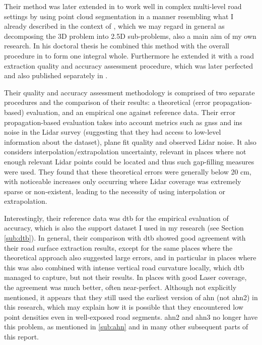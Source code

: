 Their method was later extended in \cite{oudeElberink_vosselman_2009} to work well in complex multi-level road settings by using point cloud segmentation in a manner resembling what I already described in the context of \cite{boyko_funkhauser_2011}, which we may regard in general as decomposing the 3D problem into 2.5D sub-problems, also a main aim of my own research. In his doctoral thesis \cite{oudeElberink_2010} he combined this method with the overall procedure in \cite{oudeElberink_vosselman_2006} to form one integral whole. Furthermore he extended it with a road extraction quality and accuracy assessment procedure, which was later perfected and also published separately in \cite{oudeElberink_vosselman_2012}.

Their quality and accuracy assessment methodology is comprised of two separate procedures and the comparison of their results: a theoretical (error propagation-based) evaluation, and an empirical one against reference data. Their error propagation-based evaluation takes into account metrics such as \ac{gnss} and \ac{ins} noise in the Lidar survey (suggesting that they had access to low-level information about the dataset), plane fit quality and observed Lidar noise. It also considers interpolation/extrapolation uncertainty, relevant in places where not enough relevant Lidar points could be located and thus such gap-filling measures were used. They found that these theoretical errors were generally below 20 cm, with noticeable increases only occurring where Lidar coverage was extremely sparse or non-existent, leading to the necessity of using interpolation or extrapolation. 

Interestingly, their reference data was \ac{dtb} for the empirical evaluation of accuracy, which is also the support dataset I used in my research (see Section \ref{sub:dtb}). In general, their comparison with \ac{dtb} showed good agreement with their road surface extraction results, except for the same places where the theoretical approach also suggested large errors, and in particular in places where this was also combined with intense vertical road curvature locally, which \ac{dtb} managed to capture, but not their results. In places with good Laser coverage, the agreement was much better, often near-perfect. Although not explicitly mentioned, it appears that they still used the earliest version of \ac{ahn} (not \ac{ahn2}) in this research, which may explain how it is possible that they encountered low point densities even in well-exposed road segments. \ac{ahn2} and \ac{ahn3} no longer have this problem, as mentioned in \ref{sub:ahn} and in many other subsequent parts of this report.

